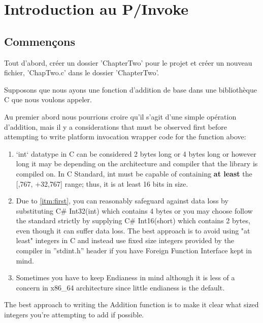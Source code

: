 \chapter{Introduction au P/Invoke}

\section{Commençons}
Tout d'abord, créer un dossier 'ChapterTwo' pour le projet et créer un nouveau fichier, 'ChapTwo.c' dans le dossier 'ChapterTwo'.

Supposons que nous ayons une fonction d’addition de base dans une bibliothèque C que nous voulons appeler.



Au premier abord nous pourrions croire qu'il s'agit d'une simple opération d'addition, mais il y a \newline considerations that must be observed first before attempting to write platform invocation wrapper code for the function above:

\begin{enumerate}
	\item \label{itm:first} `int` datatype in C can be considered 2 bytes long or 4 bytes long or however long it may be depending on the architecture and compiler that the library is compiled on. In C Standard, int must be capable of containing \textbf{at least} the [,767, +32,767] range; thus, it is at least 16 bits in size.
	
	\item Due to \ref{itm:first}, you can reasonably safeguard against data loss by substituting C\# Int32(int) which contains 4 bytes or you may choose follow the standard strictly by supplying C\# Int16(short) which contains 2 bytes, even though it can suffer data loss. The best approach is to avoid using "at least" integers in C and instead use fixed size integers provided by the compiler in ''stdint.h'' header if you have Foreign Function Interface kept in mind.
	
	\item Sometimes you have to keep Endianess in mind although it is less of a concern in x86\_64 architecture since little endianess is the default.
\end{enumerate}
The best approach to writing the Addition function is to make it clear what sized integers you're attempting to add  if possible.


